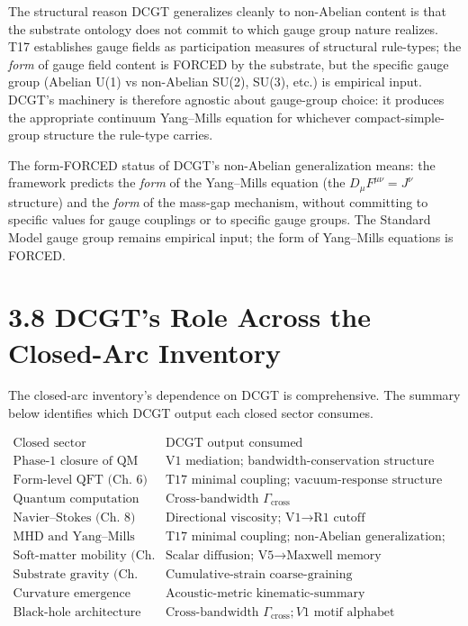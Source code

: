 \documentclass[11pt]{book}
\begin{document}
The structural reason DCGT generalizes cleanly to non-Abelian content is that the substrate ontology does not commit to which gauge group nature realizes. T17 establishes gauge fields as participation measures of structural rule-types; the \textit{form} of gauge field content is FORCED by the substrate, but the specific gauge group (Abelian U(1) vs non-Abelian SU(2), SU(3), etc.) is empirical input. DCGT's machinery is therefore agnostic about gauge-group choice: it produces the appropriate continuum Yang–Mills equation for whichever compact-simple-group structure the rule-type carries.

The form-FORCED status of DCGT's non-Abelian generalization means: the framework predicts the \textit{form} of the Yang–Mills equation (the $D_\mu F^{\mu\nu} = J^\nu$ structure) and the \textit{form} of the mass-gap mechanism, without committing to specific values for gauge couplings or to specific gauge groups. The Standard Model gauge group remains empirical input; the form of Yang–Mills equations is FORCED.

\section{3.8 DCGT's Role Across the Closed-Arc Inventory}

The closed-arc inventory's dependence on DCGT is comprehensive. The summary below identifies which DCGT output each closed sector consumes.

\[
\begin{array}{l|l}
\text{Closed sector} & \text{DCGT output consumed} \\
\hline
\text{Phase-1 closure of QM (Ch. 5)} & \text{V1 mediation; bandwidth-conservation structure} \\
\text{Form-level QFT (Ch. 6)} & \text{T17 minimal coupling; vacuum-response structure} \\
\text{Quantum computation (Ch. 7)} & \text{Cross-bandwidth } \Gamma_\mathrm{cross} \\
\text{Navier–Stokes (Ch. 8)} & \text{Directional viscosity; V1→R1 cutoff} \\
\text{MHD and Yang–Mills (Ch. 9)} & \text{T17 minimal coupling; non-Abelian generalization; V1 mass-gap} \\
\text{Soft-matter mobility (Ch. 10)} & \text{Scalar diffusion; V5→Maxwell memory} \\
\text{Substrate gravity (Ch. 11)} & \text{Cumulative-strain coarse-graining} \\
\text{Curvature emergence (Ch. 12)} & \text{Acoustic-metric kinematic-summary} \\
\text{Black-hole architecture (Ch. 13)} & \text{Cross-bandwidth } \Gamma_\mathrm{cross}; V1\text{ motif alphabet} \\
\end{array}
\]
\end{document}
